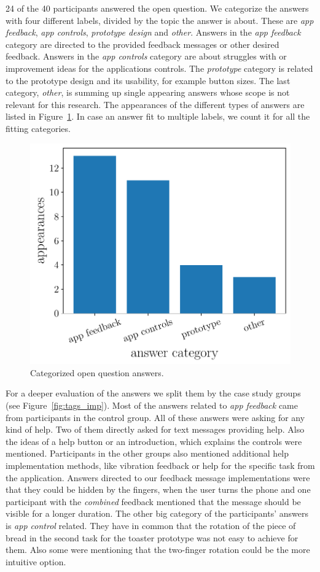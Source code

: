 \documentclass[manuscript]{acmart}
\begin{document}
			24 of the 40 participants answered the open question. We categorize the answers with four different labels, divided by the topic the answer is about. These are \emph{app feedback}, \emph{app controls}, \emph{prototype design} and \emph{other}. Answers in the \emph{app feedback} category are directed to the provided feedback messages or other desired feedback. Answers in the \emph{app controls} category are about struggles with or improvement ideas for the applications controls. The \emph{prototype} category is related to the prototype design and its usability, for example button sizes. The last category, \emph{other}, is summing up single appearing answers whose scope is not relevant for this research. The appearances of the different types of answers are listed in Figure~\ref{fig:tags}. In case an answer fit to multiple labels, we count it for all the fitting categories.

			\begin{figure}[H]
				\centering
				\includegraphics[width=.49\textwidth]{img/plot/plot_tags.pdf}
				\caption{Categorized open question answers.}
				\label{fig:tags}
			\end{figure}
			
			For a deeper evaluation of the answers we split them by the case study groups (see Figure~\ref{fig:tags_imp}). 
			Most of the answers related to \emph{app feedback} came from participants in the control group. All of these answers were asking for any kind of help. Two of them directly asked for text messages providing help. Also the ideas of a help button or an introduction, which explains the controls were mentioned. Participants in the other groups also mentioned additional help implementation methods, like vibration feedback or help for the specific task from the application. Answers directed to our feedback message implementations were that they could be hidden by the fingers, when the user turns the phone and one participant with the \emph{combined} feedback mentioned that the message should be visible for a longer duration. The other big category of the participants' answers is \emph{app control} related. They have in common that the rotation of the piece of bread in the second task for the toaster prototype was not easy to achieve for them. Also some were mentioning that the two-finger rotation could be the more intuitive option.
\end{document}
